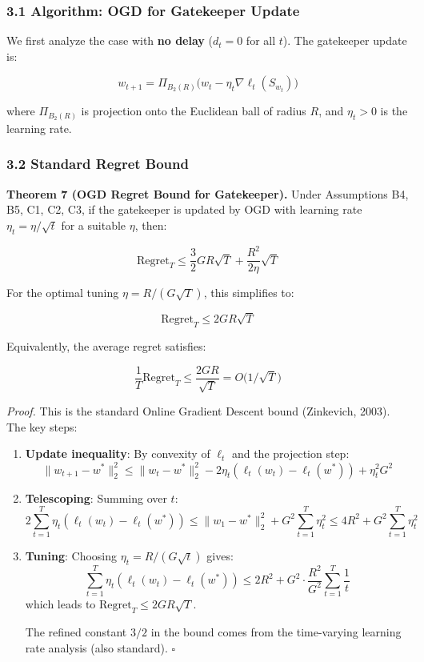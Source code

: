 \documentclass[
  12pt,
]{article}
\begin{document}
\subsubsection{3.1 Algorithm: OGD for Gatekeeper
Update}\label{algorithm-ogd-for-gatekeeper-update}

We first analyze the case with \textbf{no delay} (\(d_t = 0\) for all
\(t\)). The gatekeeper update is:

\[w_{t+1} = \Pi_{B_2(R)}\bigl( w_t - \eta_t \nabla \ell_t(S_{w_t}) \bigr)\]

where \(\Pi_{B_2(R)}\) is projection onto the Euclidean ball of radius
\(R\), and \(\eta_t > 0\) is the learning rate.

\subsubsection{3.2 Standard Regret Bound}\label{standard-regret-bound}

\textbf{Theorem 7 (OGD Regret Bound for Gatekeeper).} Under Assumptions
B4, B5, C1, C2, C3, if the gatekeeper is updated by OGD with learning
rate \(\eta_t = \eta/\sqrt{t}\) for a suitable \(\eta\), then:

\[\text{Regret}_T \leq \frac{3}{2} GR \sqrt{T} + \frac{R^2}{2\eta} \sqrt{T}\]

For the optimal tuning \(\eta = R/(G\sqrt{T})\), this simplifies to:

\[\boxed{\;\text{Regret}_T \leq 2GR\sqrt{T}\;}\]

Equivalently, the average regret satisfies:

\[\frac{1}{T} \text{Regret}_T \leq \frac{2GR}{\sqrt{T}} = O\bigl(1/\sqrt{T}\bigr)\]

\emph{Proof.} This is the standard Online Gradient Descent bound
(Zinkevich, 2003). The key steps:

\begin{enumerate}
\def\labelenumi{\arabic{enumi}.}
\item
  \textbf{Update inequality}: By convexity of \(\ell_t\) and the
  projection step:
  \[\|w_{t+1} - w^*\|_2^2 \leq \|w_t - w^*\|_2^2 - 2\eta_t(\ell_t(w_t) - \ell_t(w^*)) + \eta_t^2 G^2\]
\item
  \textbf{Telescoping}: Summing over \(t\):
  \[2\sum_{t=1}^T \eta_t(\ell_t(w_t) - \ell_t(w^*)) \leq \|w_1 - w^*\|_2^2 + G^2\sum_{t=1}^T \eta_t^2 \leq 4R^2 + G^2\sum_{t=1}^T \eta_t^2\]
\item
  \textbf{Tuning}: Choosing \(\eta_t = R/(G\sqrt{t})\) gives:
  \[\sum_{t=1}^T \eta_t(\ell_t(w_t) - \ell_t(w^*)) \leq 2R^2 + G^2 \cdot \frac{R^2}{G^2} \sum_{t=1}^T \frac{1}{t}\]
  which leads to \(\text{Regret}_T \leq 2GR\sqrt{T}\).

  The refined constant \(3/2\) in the bound comes from the time-varying
  learning rate analysis (also standard). \(\square\)
\end{enumerate}
\end{document}
